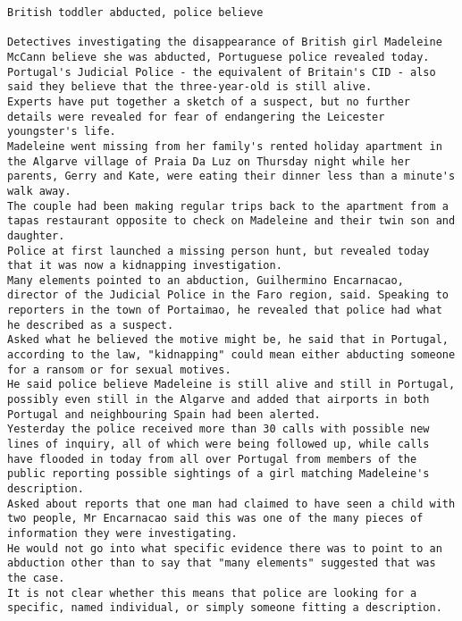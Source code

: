 \begin{lstlisting}[numberstyle=\tiny\color{black},  keywordstyle=\color{black},  commentstyle=\color{black},  stringstyle=\color{black}, caption={The Guardian: British toddler abducted, police believe. Published: 5th of May 2007. URL: https://www.theguardian.com/uk/2007/may/05/madeleinemccann}, captionpos=t]
British toddler abducted, police believe 
 
Detectives investigating the disappearance of British girl Madeleine McCann believe she was abducted, Portuguese police revealed today. 
Portugal's Judicial Police - the equivalent of Britain's CID - also said they believe that the three-year-old is still alive. 
Experts have put together a sketch of a suspect, but no further details were revealed for fear of endangering the Leicester youngster's life. 
Madeleine went missing from her family's rented holiday apartment in the Algarve village of Praia Da Luz on Thursday night while her parents, Gerry and Kate, were eating their dinner less than a minute's walk away. 
The couple had been making regular trips back to the apartment from a tapas restaurant opposite to check on Madeleine and their twin son and daughter. 
Police at first launched a missing person hunt, but revealed today that it was now a kidnapping investigation. 
Many elements pointed to an abduction, Guilhermino Encarnacao, director of the Judicial Police in the Faro region, said. Speaking to reporters in the town of Portaimao, he revealed that police had what he described as a suspect. 
Asked what he believed the motive might be, he said that in Portugal, according to the law, "kidnapping" could mean either abducting someone for a ransom or for sexual motives. 
He said police believe Madeleine is still alive and still in Portugal, possibly even still in the Algarve and added that airports in both Portugal and neighbouring Spain had been alerted. 
Yesterday the police received more than 30 calls with possible new lines of inquiry, all of which were being followed up, while calls have flooded in today from all over Portugal from members of the public reporting possible sightings of a girl matching Madeleine's description. 
Asked about reports that one man had claimed to have seen a child with two people, Mr Encarnacao said this was one of the many pieces of information they were investigating. 
He would not go into what specific evidence there was to point to an abduction other than to say that "many elements" suggested that was the case. 
It is not clear whether this means that police are looking for a specific, named individual, or simply someone fitting a description. 

\end{lstlisting}
